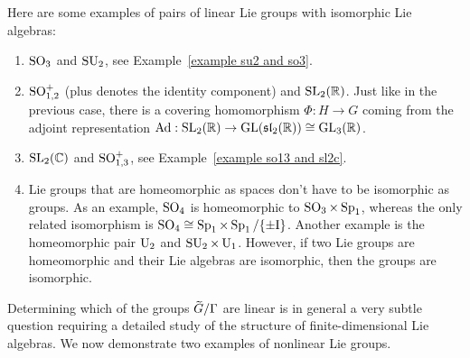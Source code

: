 \begin{example}
    Here are some examples of pairs of linear Lie groups with isomorphic Lie algebras:
    \begin{enumerate}
        \item $\operatorname{SO}_3$ and $\operatorname{SU}_2$, see Example~\ref{example su2 and so3}.
        \item $\operatorname{SO}^+_{1,2}$ (plus denotes the identity component) and $\operatorname{SL}_2(\mathbb{R})$. Just like in the previous case, there is a covering homomorphism $\Phi:H\to G$ coming from the adjoint representation $\mathrm{Ad}:\operatorname{SL}_2(\mathbb{R})\to \operatorname{GL}(\mathfrak{sl}_2(\mathbb{R}))\cong \operatorname{GL}_3(\mathbb{R})$.
        \item $\operatorname{SL}_2(\mathbb{C})$ and $\operatorname{SO}_{1,3}^+$, see Example~\ref{example so13 and sl2c}.
        \item Lie groups that are homeomorphic as spaces don't have to be isomorphic as groups. As an example, $\operatorname{SO}_4$ is homeomorphic to $\operatorname{SO}_3\times \operatorname{Sp}_1$, whereas the only related isomorphism is $\operatorname{SO}_4\cong \operatorname{Sp}_1\times\operatorname{Sp}_1\slash \{\pm \mathrm{I}\}$. Another example is the homeomorphic pair $\operatorname{U}_2$ and $\operatorname{SU}_2\times \operatorname{U}_1$. However, if two Lie groups are homeomorphic and their Lie algebras are isomorphic, then the groups are isomorphic.
    \end{enumerate}
\end{example}


Determining which of the groups $\wt{G}\slash \Gamma$ are linear is in general a very subtle question requiring a detailed study of the structure of finite-dimensional Lie algebras. We now demonstrate two examples of nonlinear Lie groups.

